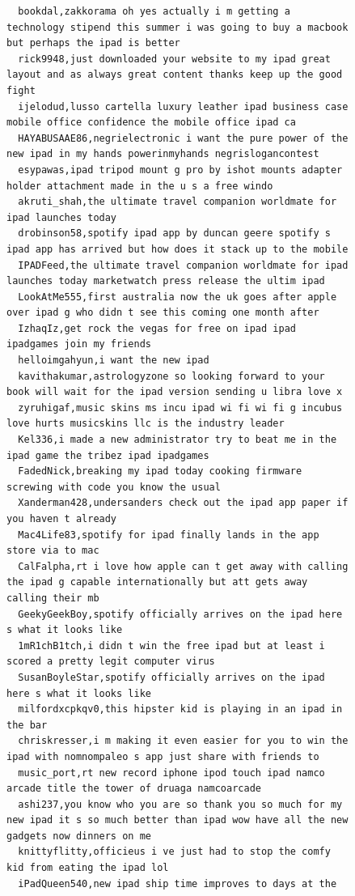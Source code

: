 \begin{figure}[htpb]
\begin{verbatim}
  bookdal,zakkorama oh yes actually i m getting a technology stipend this summer i was going to buy a macbook but perhaps the ipad is better
  rick9948,just downloaded your website to my ipad great layout and as always great content thanks keep up the good fight
  ijelodud,lusso cartella luxury leather ipad business case mobile office confidence the mobile office ipad ca
  HAYABUSAAE86,negrielectronic i want the pure power of the new ipad in my hands powerinmyhands negrislogancontest
  esypawas,ipad tripod mount g pro by ishot mounts adapter holder attachment made in the u s a free windo
  akruti_shah,the ultimate travel companion worldmate for ipad launches today
  drobinson58,spotify ipad app by duncan geere spotify s ipad app has arrived but how does it stack up to the mobile
  IPADFeed,the ultimate travel companion worldmate for ipad launches today marketwatch press release the ultim ipad
  LookAtMe555,first australia now the uk goes after apple over ipad g who didn t see this coming one month after
  IzhaqIz,get rock the vegas for free on ipad ipad ipadgames join my friends
  helloimgahyun,i want the new ipad
  kavithakumar,astrologyzone so looking forward to your book will wait for the ipad version sending u libra love x
  zyruhigaf,music skins ms incu ipad wi fi wi fi g incubus love hurts musicskins llc is the industry leader
  Kel336,i made a new administrator try to beat me in the ipad game the tribez ipad ipadgames
  FadedNick,breaking my ipad today cooking firmware screwing with code you know the usual
  Xanderman428,undersanders check out the ipad app paper if you haven t already
  Mac4Life83,spotify for ipad finally lands in the app store via to mac
  CalFalpha,rt i love how apple can t get away with calling the ipad g capable internationally but att gets away calling their mb
  GeekyGeekBoy,spotify officially arrives on the ipad here s what it looks like
  1mR1chB1tch,i didn t win the free ipad but at least i scored a pretty legit computer virus
  SusanBoyleStar,spotify officially arrives on the ipad here s what it looks like
  milfordxcpkqv0,this hipster kid is playing in an ipad in the bar
  chriskresser,i m making it even easier for you to win the ipad with nomnompaleo s app just share with friends to
  music_port,rt new record iphone ipod touch ipad namco arcade title the tower of druaga namcoarcade
  ashi237,you know who you are so thank you so much for my new ipad it s so much better than ipad wow have all the new gadgets now dinners on me
  knittyflitty,officieus i ve just had to stop the comfy kid from eating the ipad lol
  iPadQueen540,new ipad ship time improves to days at the

\end{verbatim}
\end{figure}
